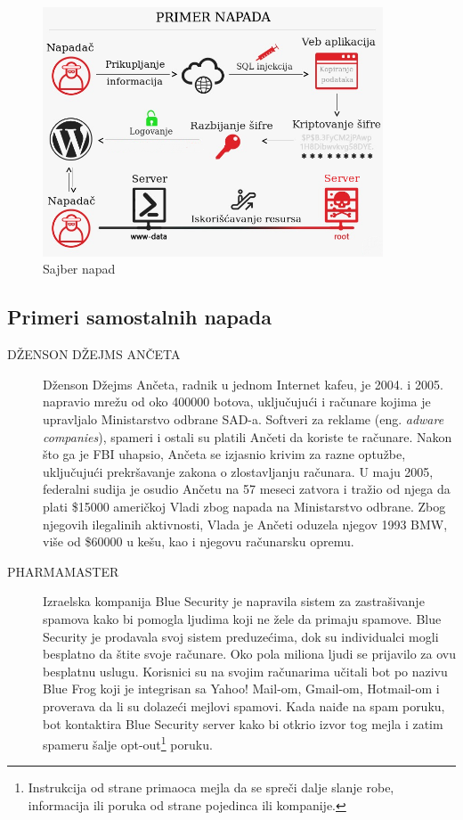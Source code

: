 \documentclass[a4paper]{article}
\theoremstyle{break}
\begin{document}
{\begin{figure}[h!]
\begin{center}
\includegraphics[height=0.48\textwidth, width=0.9\textwidth]{napad.png}
\end{center}
\caption{Sajber napad}
\label{fig:primer_napada}
\end{figure}

\subsection{Primeri samostalnih napada}
\label{subsec:primeri_samo_napada}

\begin{description}
\item[DŽENSON DŽEJMS ANČETA] Dženson Džejms Ančeta, radnik u jednom Internet kafeu, je 2004. i 2005. napravio mrežu od oko 400000 botova, uključujući i računare kojima je upravljalo Ministarstvo odbrane SAD-a. Softveri za reklame (eng. {\em adware companies}), spameri i ostali su platili Ančeti da koriste te računare. Nakon što ga je FBI uhapsio, Ančeta se izjasnio krivim za razne optužbe, uključujući prekršavanje zakona o zlostavljanju računara. U maju 2005, federalni sudija je osudio Ančetu na 57 meseci zatvora i tražio od njega da plati \$15000 američkoj Vladi zbog napada na Ministarstvo odbrane. Zbog njegovih ilegalinih aktivnosti, Vlada je Ančeti oduzela njegov 1993 BMW, više od \$60000 u kešu, kao i njegovu računarsku opremu.


\item[PHARMAMASTER] Izraelska kompanija Blue Security je napravila sistem za zastrašivanje spamova kako bi pomogla ljudima koji ne žele da primaju spamove. Blue Security je prodavala svoj sistem preduzećima, dok su individualci mogli besplatno da štite svoje računare. Oko pola miliona ljudi se prijavilo za ovu besplatnu uslugu. Korisnici su na svojim računarima učitali bot po nazivu Blue Frog koji je integrisan sa Yahoo! Mail-om, Gmail-om, Hotmail-om i proverava da li su dolazeći mejlovi spamovi. Kada naiđe na spam poruku, bot kontaktira Blue Security server kako bi otkrio izvor tog mejla i zatim spameru šalje opt-out\footnote{Instrukcija od strane primaoca mejla da se spreči dalje slanje robe, informacija ili poruka od strane pojedinca ili kompanije.} poruku.


\end{description}}
\end{document}
